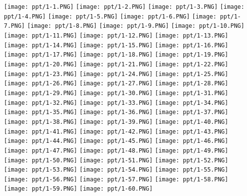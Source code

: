 \documentclass[UTF-8]{ctexart}
\begin{document}
\begin{center}
    \texttt{[image: ppt/1-1.PNG]}
\texttt{[image: ppt/1-2.PNG]}
\texttt{[image: ppt/1-3.PNG]}
\texttt{[image: ppt/1-4.PNG]}
\texttt{[image: ppt/1-5.PNG]}
\texttt{[image: ppt/1-6.PNG]}
\texttt{[image: ppt/1-7.PNG]}
\texttt{[image: ppt/1-8.PNG]}
\texttt{[image: ppt/1-9.PNG]}
\texttt{[image: ppt/1-10.PNG]}
\texttt{[image: ppt/1-11.PNG]}
\texttt{[image: ppt/1-12.PNG]}
\texttt{[image: ppt/1-13.PNG]}
\texttt{[image: ppt/1-14.PNG]}
\texttt{[image: ppt/1-15.PNG]}
\texttt{[image: ppt/1-16.PNG]}
\texttt{[image: ppt/1-17.PNG]}
\texttt{[image: ppt/1-18.PNG]}
\texttt{[image: ppt/1-19.PNG]}
\texttt{[image: ppt/1-20.PNG]}
\texttt{[image: ppt/1-21.PNG]}
\texttt{[image: ppt/1-22.PNG]}
\texttt{[image: ppt/1-23.PNG]}
\texttt{[image: ppt/1-24.PNG]}
\texttt{[image: ppt/1-25.PNG]}
\texttt{[image: ppt/1-26.PNG]}
\texttt{[image: ppt/1-27.PNG]}
\texttt{[image: ppt/1-28.PNG]}
\texttt{[image: ppt/1-29.PNG]}
\texttt{[image: ppt/1-30.PNG]}
\texttt{[image: ppt/1-31.PNG]}
\texttt{[image: ppt/1-32.PNG]}
\texttt{[image: ppt/1-33.PNG]}
\texttt{[image: ppt/1-34.PNG]}
\texttt{[image: ppt/1-35.PNG]}
\texttt{[image: ppt/1-36.PNG]}
\texttt{[image: ppt/1-37.PNG]}
\texttt{[image: ppt/1-38.PNG]}
\texttt{[image: ppt/1-39.PNG]}
\texttt{[image: ppt/1-40.PNG]}
\texttt{[image: ppt/1-41.PNG]}
\texttt{[image: ppt/1-42.PNG]}
\texttt{[image: ppt/1-43.PNG]}
\texttt{[image: ppt/1-44.PNG]}
\texttt{[image: ppt/1-45.PNG]}
\texttt{[image: ppt/1-46.PNG]}
\texttt{[image: ppt/1-47.PNG]}
\texttt{[image: ppt/1-48.PNG]}
\texttt{[image: ppt/1-49.PNG]}
\texttt{[image: ppt/1-50.PNG]}
\texttt{[image: ppt/1-51.PNG]}
\texttt{[image: ppt/1-52.PNG]}
\texttt{[image: ppt/1-53.PNG]}
\texttt{[image: ppt/1-54.PNG]}
\texttt{[image: ppt/1-55.PNG]}
\texttt{[image: ppt/1-56.PNG]}
\texttt{[image: ppt/1-57.PNG]}
\texttt{[image: ppt/1-58.PNG]}
\texttt{[image: ppt/1-59.PNG]}
\texttt{[image: ppt/1-60.PNG]}

\end{center}
\end{document}

